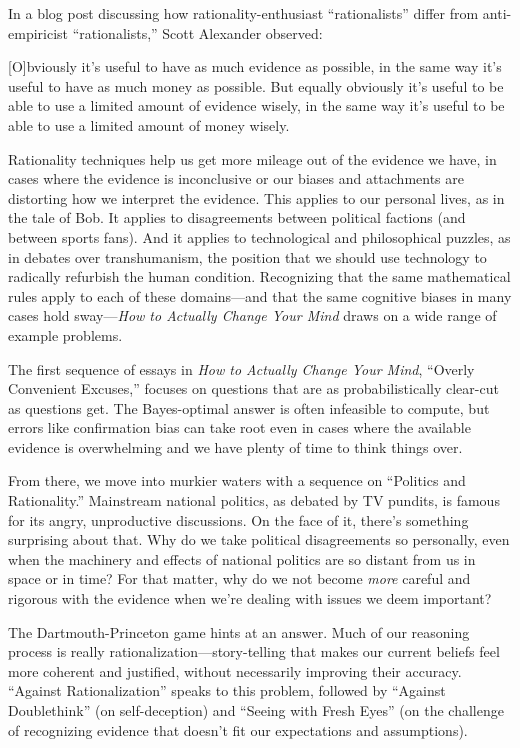 {
 In a blog post discussing how rationality-enthusiast
``rationalists'' differ from
anti-empiricist ``rationalists,''
Scott Alexander observed:}

{
 [O]bviously it's useful to have as much evidence
as possible, in the same way it's useful to have as
much money as possible. But equally obviously it's
useful to be able to use a limited amount of evidence wisely, in the
same way it's useful to be able to use a limited amount
of money wisely.}

{
 Rationality techniques help us get more mileage out of the
evidence we have, in cases where the evidence is inconclusive or our
biases and attachments are distorting how we interpret the evidence.
This applies to our personal lives, as in the tale of Bob. It applies
to disagreements between political factions (and between sports fans).
And it applies to technological and philosophical puzzles, as in
debates over transhumanism, the position that we should use technology
to radically refurbish the human condition. Recognizing that the same
mathematical rules apply to each of these domains---and that the same
cognitive biases in many cases hold sway---\textit{How to Actually
Change Your Mind} draws on a wide range of example problems.}

{
 The first sequence of essays in \textit{How to Actually Change
Your Mind}, ``Overly Convenient
Excuses,'' focuses on questions that are as
probabilistically clear-cut as questions get. The Bayes-optimal answer
is often infeasible to compute, but errors like confirmation bias can
take root even in cases where the available evidence is overwhelming
and we have plenty of time to think things over.}

{
 From there, we move into murkier waters with a sequence on
``Politics and Rationality.''
Mainstream national politics, as debated by TV pundits, is famous for
its angry, unproductive discussions. On the face of it,
there's something surprising about that. Why do we take
political disagreements so personally, even when the machinery and
effects of national politics are so distant from us in space or in
time? For that matter, why do we not become \textit{more} careful and
rigorous with the evidence when we're dealing with
issues we deem important?}

{
 The Dartmouth-Princeton game hints at an answer. Much of our
reasoning process is really rationalization---story-telling that makes
our current beliefs feel more coherent and justified, without
necessarily improving their accuracy. ``Against
Rationalization'' speaks to this problem, followed by
``Against Doublethink'' (on
self-deception) and ``Seeing with Fresh
Eyes'' (on the challenge of recognizing evidence that
doesn't fit our expectations and assumptions).}

